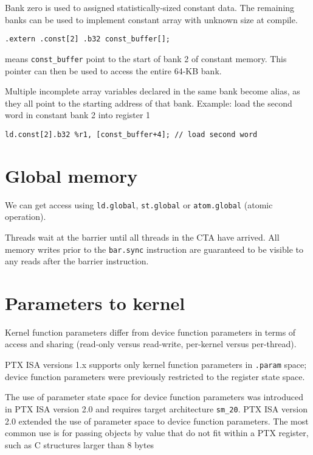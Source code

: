 Bank zero is used to assigned statistically-sized constant data. The
remaining banks can be used to implement constant array with unknown
size at compile. 
\begin{lstlisting}
.extern .const[2] .b32 const_buffer[];
\end{lstlisting}
means \verb!const_buffer! point to the start of bank 2 of constant
memory. This pointer can then be used to access the entire 64-KB
bank. 

Multiple incomplete array variables declared in the same bank become
alias, as they all point to the starting address of that
bank. Example: load the second word in constant bank 2 into register 1
\begin{lstlisting}
ld.const[2].b32 %r1, [const_buffer+4]; // load second word
\end{lstlisting}

\section{Global memory}
\label{sec:global-memory-1}

We can get access using \verb!ld.global!, \verb!st.global! or
\verb!atom.global! (atomic operation). 


Threads wait at the barrier until all threads in the CTA have
arrived. All memory writes prior to the \verb!bar.sync! instruction
are guaranteed to be visible to any reads after the barrier
instruction.



\section{Parameters to kernel}
\label{sec:parameters-kernel}

Kernel function parameters differ from device function parameters in
terms of access and sharing (read-only versus read-write, per-kernel
versus per-thread).


PTX ISA versions 1.x supports only kernel function parameters in
\verb!.param! space; device function parameters were previously
restricted to the register state space.

The use of parameter state space for device function parameters was
introduced in PTX ISA version 2.0 and requires target architecture
\verb!sm_20!. PTX ISA version 2.0 extended the use of parameter space
to device function parameters.  The most common use is for passing
objects by value that do not fit within a PTX register, such as C
structures larger than 8 bytes


